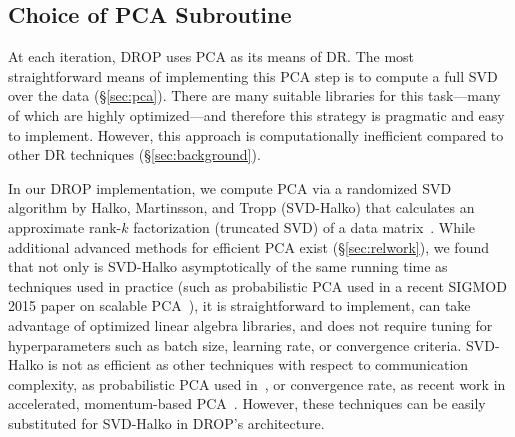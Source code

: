 \subsection{Choice of PCA Subroutine}
\label{subsec:pcaroutine}

At each iteration, DROP uses PCA as its means of DR.
The most straightforward means of implementing this PCA step is to compute a full SVD over the data (\S\ref{sec:pca}).
There are many suitable libraries for this task---many of which are highly optimized---and therefore this strategy is pragmatic and easy to implement. 
However, this approach is computationally inefficient compared to other DR techniques (\S\ref{sec:background}).  

In our DROP implementation, we compute PCA via a randomized SVD algorithm by Halko, Martinsson, and Tropp (SVD-Halko) that calculates an approximate rank-$k$ factorization (truncated SVD) of a data matrix~\cite{tropp}. 
While additional advanced methods for efficient PCA exist (\S\ref{sec:relwork}), we found that not only is SVD-Halko asymptotically of the same running time as techniques used in practice (such as probabilistic PCA used in a recent SIGMOD 2015 paper on scalable PCA~\cite{ppca-sigmod}), it is straightforward to implement, can take advantage of optimized linear algebra libraries, and does not require tuning for hyperparameters such as batch size, learning rate, or convergence criteria.  
SVD-Halko is not as efficient as other techniques with respect to communication complexity, as probabilistic PCA used in~\cite{ppca-sigmod}, or convergence rate, as recent work in accelerated, momentum-based PCA~\cite{re-new}.
However, these techniques can be easily substituted for SVD-Halko in DROP's architecture.

